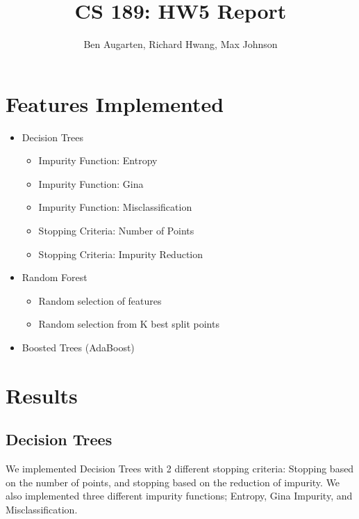 \documentclass[11pt,a4paper]{article}
\author{Ben Augarten, Richard Hwang, Max Johnson}
\title{CS 189: HW5 Report}
\begin{document}
\maketitle
\section{Features Implemented}
\begin{itemize}
\item Decision Trees
\begin{itemize}
\item Impurity Function: Entropy
\item Impurity Function: Gina
\item Impurity Function: Misclassification
\item Stopping Criteria: Number of Points
\item Stopping Criteria: Impurity Reduction
\end{itemize}
\item Random Forest
\begin{itemize}
\item Random selection of features
\item Random selection from K best split points
\end{itemize}
\item Boosted Trees (AdaBoost)
\end{itemize}
\section{Results}
\subsection{Decision Trees}
We implemented Decision Trees with 2 different stopping criteria: Stopping based on the number of points, and stopping based on the reduction of impurity. We also implemented three different impurity functions; Entropy, Gina Impurity, and Misclassification.
\end{document}
